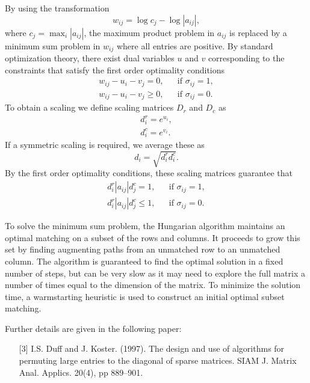 By using the transformation
$$
   w_{ij} = \log c_j - \log |a_{ij}|,
$$
where $c_j = \max_i |a_{ij}|$, the maximum product problem in $a_{ij}$ is
replaced by a minimum sum problem in $w_{ij}$ where all entries are positive.
By standard optimization theory, there exist dual variables $u$ and $v$
corresponding to the constraints that satisfy the first order optimality
conditions
\begin{eqnarray*}
   w_{ij} - u_i - v_j = 0, && \mbox{if } \sigma_{ij }=1, \\
   w_{ij} - u_i - v_j \ge 0, && \mbox{if } \sigma_{ij }=0.
\end{eqnarray*}
To obtain a scaling we define scaling matrices $D_r$ and $D_c$ as
\begin{eqnarray*}
   & d^r_i = e^{u_i}, & \\
   & d^c_i = e^{v_i}. &
\end{eqnarray*}
If a symmetric scaling is required, we average these as
$$
   d_i = \sqrt{d^r_id^c_i}.
$$
By the first order optimality conditions, these scaling matrices guarantee that
\begin{eqnarray*}
   d^r_i|a_{ij}|d^c_j = 1, && \mbox{if } \sigma_{ij}=1, \\
   d^r_i|a_{ij}|d^c_j \le 1, && \mbox{if } \sigma_{ij}=0.
\end{eqnarray*}

To solve the minimum sum problem, the Hungarian algorithm maintains an optimal
matching on a subset of
the rows and columns. It proceeds to grow this set by finding augmenting paths
from an unmatched row to an unmatched column. The algorithm is guaranteed to
find the optimal solution in a fixed number of steps, but can be very slow as
it may need to explore the full matrix a number of times equal to the dimension
of the matrix. To minimize the solution time, a warmstarting heuristic is used
to construct an initial optimal subset matching.

\noindent
Further details are given in the following paper:
\begin{itemize}
   \item[{[3]}] I.S. Duff and J. Koster. (1997). The design and use of algorithms for permuting large entries to the diagonal of sparse matrices. SIAM J. Matrix Anal. Applics. 20(4), pp 889--901.
\end{itemize}

